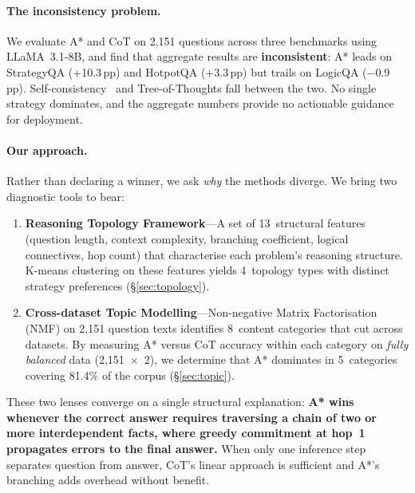 \documentclass[11pt]{article}
\newcommand{\pp}{\,pp}
\begin{document}
\paragraph{The inconsistency problem.}
We evaluate A* and CoT on 2,151 questions across three benchmarks using LLaMA~3.1-8B, and find that aggregate results are \textbf{inconsistent}: A* leads on StrategyQA (+10.3\pp) and HotpotQA (+3.3\pp) but trails on LogicQA ($-$0.9\pp). Self-consistency~\citep{wang2023self} and Tree-of-Thoughts fall between the two. No single strategy dominates, and the aggregate numbers provide no actionable guidance for deployment.

\paragraph{Our approach.}
Rather than declaring a winner, we ask \emph{why} the methods diverge. We bring two diagnostic tools to bear:

\begin{enumerate}[leftmargin=1.5em,itemsep=2pt]
\item \textbf{Reasoning Topology Framework}---A set of 13~structural features (question length, context complexity, branching coefficient, logical connectives, hop count) that characterise each problem's reasoning structure. K-means clustering on these features yields 4~topology types with distinct strategy preferences (\S\ref{sec:topology}).
\item \textbf{Cross-dataset Topic Modelling}---Non-negative Matrix Factorisation (NMF) on 2,151 question texts identifies 8~content categories that cut across datasets. By measuring A* versus CoT accuracy within each category on \emph{fully balanced} data (2,151~$\times$~2), we determine that A* dominates in 5~categories covering 81.4\% of the corpus (\S\ref{sec:topic}).
\end{enumerate}

These two lenses converge on a single structural explanation: \textbf{A* wins whenever the correct answer requires traversing a chain of two or more interdependent facts, where greedy commitment at hop~1 propagates errors to the final answer.} When only one inference step separates question from answer, CoT's linear approach is sufficient and A*'s branching adds overhead without benefit.
\end{document}
